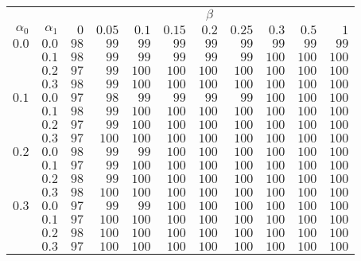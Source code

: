 \begin{tabular}{rr|rrrrrrrrr}
\hline\hline
 && \multicolumn{9}{c}{$\beta$}\\
 $\alpha_0$ & $\alpha_1$ & $0$ & $0.05$ & $0.1$ & $0.15$ & $0.2$ & $0.25$ & $0.3$ & $0.5$ & $1$ \\ 
 \hline
$0.0$ & $0.0$ & $98$ & $99$ & $99$ & $99$ & $99$ & $99$ & $99$ & $99$ & $99$\\ 
 & $0.1$ & $98$ & $99$ & $99$ & $99$ & $99$ & $99$ & $100$ & $100$ & $100$\\ 
 & $0.2$ & $97$ & $99$ & $100$ & $100$ & $100$ & $100$ & $100$ & $100$ & $100$\\ 
 & $0.3$ & $98$ & $99$ & $100$ & $100$ & $100$ & $100$ & $100$ & $100$ & $100$\\ 
\hline 
 $0.1$ & $0.0$ & $97$ & $98$ & $99$ & $99$ & $99$ & $99$ & $100$ & $100$ & $100$\\ 
 & $0.1$ & $98$ & $99$ & $100$ & $100$ & $100$ & $100$ & $100$ & $100$ & $100$\\ 
 & $0.2$ & $97$ & $99$ & $100$ & $100$ & $100$ & $100$ & $100$ & $100$ & $100$\\ 
 & $0.3$ & $97$ & $100$ & $100$ & $100$ & $100$ & $100$ & $100$ & $100$ & $100$\\ 
\hline 
 $0.2$ & $0.0$ & $98$ & $99$ & $99$ & $100$ & $100$ & $100$ & $100$ & $100$ & $100$\\ 
 & $0.1$ & $97$ & $99$ & $100$ & $100$ & $100$ & $100$ & $100$ & $100$ & $100$\\ 
 & $0.2$ & $98$ & $99$ & $100$ & $100$ & $100$ & $100$ & $100$ & $100$ & $100$\\ 
 & $0.3$ & $98$ & $100$ & $100$ & $100$ & $100$ & $100$ & $100$ & $100$ & $100$\\ 
\hline 
 $0.3$ & $0.0$ & $97$ & $99$ & $99$ & $100$ & $100$ & $100$ & $100$ & $100$ & $100$\\ 
 & $0.1$ & $97$ & $100$ & $100$ & $100$ & $100$ & $100$ & $100$ & $100$ & $100$\\ 
 & $0.2$ & $98$ & $100$ & $100$ & $100$ & $100$ & $100$ & $100$ & $100$ & $100$\\ 
 & $0.3$ & $97$ & $100$ & $100$ & $100$ & $100$ & $100$ & $100$ & $100$ & $100$\\ 
 \hline 
 \end{tabular}
